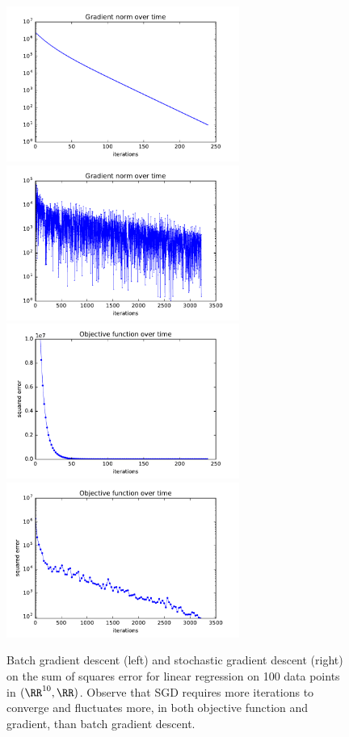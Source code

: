 \documentclass{article}
\begin{document}
\begin{multicols}{2}
\begin{figure}
   \centering
   \includegraphics[width=3in]{img/1-1-batch.pdf}
   \includegraphics[width=3in]{img/1-1-stoch.pdf}
   \includegraphics[width=3in]{img/1-1-batch-func.pdf}
   \includegraphics[width=3in]{img/1-1-stoch-func.pdf}
   \caption{Batch gradient descent (left) and stochastic gradient descent (right) on the sum of squares error for linear regression on 100 data points in $(\RR^{10},\RR)$. Observe that SGD requires more iterations to converge and fluctuates more, in both objective function and gradient, than batch gradient descent.}
   \label{fig:1.2}
\end{figure}




\end{multicols}
\end{document}
